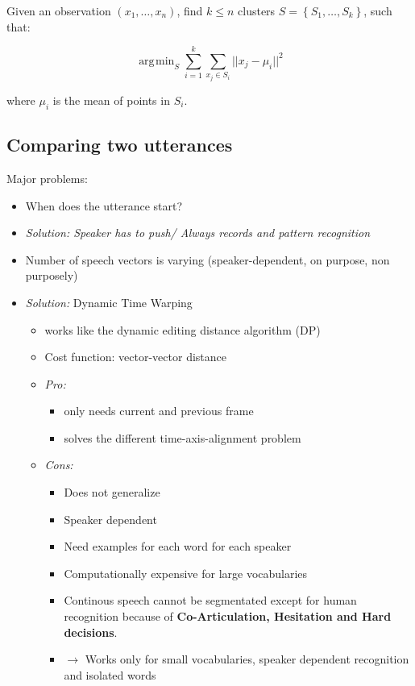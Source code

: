 \documentclass[11pt]{article}
\DeclareMathOperator*{\argmin}{\arg\!\min}
\begin{document}
Given an observation $(x_1, \ldots, x_n)$, find $k \leq n$ clusters $S = \left\{S_1, \ldots, S_k\right\}$, such that:

\[
    \argmin_S \sum\limits_{i = 1}^k \sum\limits_{x_j \in S_i} ||x_j - \mu_i||^2
\]

where $\mu_i$ is the mean of points in $S_i$.

\subsection{Comparing two utterances}

Major problems:
\begin{itemize}
\item When does the utterance start?
\item \emph{Solution: Speaker has to push/ Always records and pattern recognition}
\item Number of speech vectors is varying (speaker-dependent, on purpose, non purposely)


\item \emph{Solution:} Dynamic Time Warping

    \begin{itemize}
    \item works like the dynamic editing distance algorithm (DP)
    \item Cost function: vector-vector distance
    \item \emph{Pro:} 
    \begin{itemize}
    \item only needs current and previous frame 
    \item solves the different time-axis-alignment problem
    \end{itemize}
    
    \item{\emph{Cons:}}
    \begin{itemize}
    \item Does not generalize
    \item Speaker dependent
    \item Need examples for each word for each speaker
    \item Computationally expensive for large vocabularies
    \item Continous speech cannot be segmentated except for human recognition because of \textbf{Co-Articulation, Hesitation and Hard decisions}.
    \item $\rightarrow$ Works only for small vocabularies, speaker dependent recognition and isolated words
    \end{itemize}

\end{itemize}

    \end{itemize}
\end{document}
